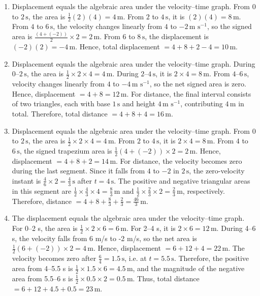 \documentclass[11pt,a4paper]{article}
\begin{document}
\begin{enumerate}
\item Displacement equals the algebraic area under the velocity–time graph. From $0$ to $2\,\text{s}$, the area is $\frac{1}{2}(2)(4)=4\,\text{m}$. From $2$ to $4\,\text{s}$, it is $(2)(4)=8\,\text{m}$. From $4$ to $6\,\text{s}$, the velocity changes linearly from $4$ to $-2\,\text{m s}^{-1}$, so the signed area is $\frac{(4+(-2))}{2}\times 2=2\,\text{m}$. From $6$ to $8\,\text{s}$, the displacement is $(-2)(2)=-4\,\text{m}$. Hence, total displacement $=4+8+2-4=10\,\text{m}$.
\item Displacement equals the algebraic area under the velocity–time graph. During $0$–$2\,\text{s}$, the area is $\frac{1}{2}\times 2\times 4=4\,\text{m}$. During $2$–$4\,\text{s}$, it is $2\times 4=8\,\text{m}$. From $4$–$6\,\text{s}$, velocity changes linearly from $4$ to $-4\,\text{m s}^{-1}$, so the net signed area is zero. Hence, displacement $=4+8=12\,\text{m}$. For distance, the final interval consists of two triangles, each with base $1\,\text{s}$ and height $4\,\text{m s}^{-1}$, contributing $4\,\text{m}$ in total. Therefore, total distance $=4+8+4=16\,\text{m}$.
\item Displacement equals the algebraic area under the velocity–time graph. From $0$ to $2\,\text{s}$, the area is $\frac{1}{2}\times2\times4=4\,\text{m}$. From $2$ to $4\,\text{s}$, it is $2\times4=8\,\text{m}$. From $4$ to $6\,\text{s}$, the signed trapezium area is $\frac{1}{2}(4+(-2))\times2=2\,\text{m}$. Hence, displacement $=4+8+2=14\,\text{m}$. For distance, the velocity becomes zero during the last segment. Since it falls from $4$ to $-2$ in $2\,\text{s}$, the zero-velocity instant is $\frac{4}{6}\times2=\frac{4}{3}\,\text{s}$ after $t=4\,\text{s}$. The positive and negative triangular areas in this segment are $\frac{1}{2}\times\frac{4}{3}\times4=\frac{8}{3}\,\text{m}$ and $\frac{1}{2}\times\frac{2}{3}\times2=\frac{2}{3}\,\text{m}$, respectively. Therefore, distance $=4+8+\frac{8}{3}+\frac{2}{3}=\frac{46}{3}\,\text{m}$.
\item The displacement equals the algebraic area under the velocity–time graph. For 0–2 s, the area is \(\frac{1}{2}\times 2\times 6=6\,\text{m}\). For 2–4 s, it is \(2\times 6=12\,\text{m}\). During 4–6 s, the velocity falls from 6 m/s to -2 m/s, so the net area is \(\frac{1}{2}(6+(-2))\times 2=4\,\text{m}\). Hence, displacement \(=6+12+4=22\,\text{m}\). The velocity becomes zero after \(\frac{6}{4}=1.5\,\text{s}\), i.e. at \(t=5.5\,\text{s}\). Therefore, the positive area from 4–5.5 s is \(\frac{1}{2}\times 1.5\times 6=4.5\,\text{m}\), and the magnitude of the negative area from 5.5–6 s is \(\frac{1}{2}\times 0.5\times 2=0.5\,\text{m}\). Thus, total distance \(=6+12+4.5+0.5=23\,\text{m}\).

\end{enumerate}
\end{document}
